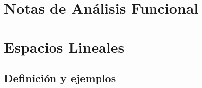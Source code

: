 \documentclass[12pt]{book}
\begin{document}
\frontmatter

\chapter*{\Huge \center Notas de An\'alisis Funcional }
\thispagestyle{empty}


\newpage








\tableofcontents

\mainmatter

\chapter{Espacios Lineales}




\section{Definici\'on y ejemplos}
\end{document}
